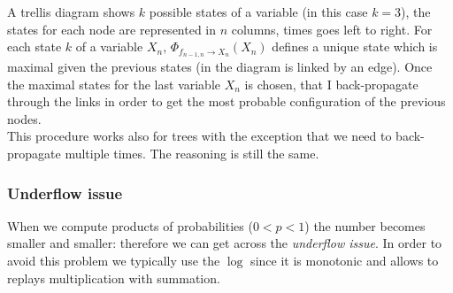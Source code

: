             A trellis diagram shows $k$ possible states of a variable (in this case $k=3$), the states for each node are represented in $n$ columns, times goes left to right. For each state $k$ of a variable $X_n$, $\Phi_{f_{n-1, n} \rightarrow X_n} (X_n)$ defines a unique state which is maximal given the previous states (in the diagram is linked by an edge).
            Once the maximal states for the last variable $X_n$ is chosen, that I back-propagate through the links in order to get the most probable configuration of the previous nodes. \\
            This procedure works also for trees with the exception that we need to back-propagate multiple times. The reasoning is still the same. 
            
        
        \subsubsection{Underflow issue}
            When we compute products of probabilities ($0 < p < 1$) the number becomes smaller and smaller: therefore we can get across the \textit{underflow issue}. In order to avoid this problem we typically use the $\log$ since it is monotonic and allows to replays multiplication with summation. 
        
